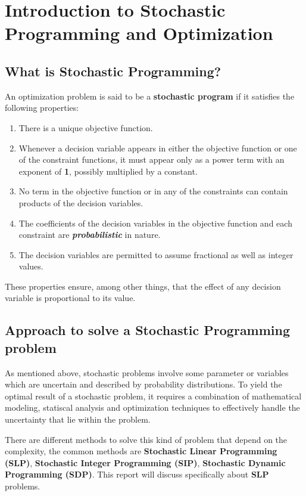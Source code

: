 \newpage
\section{Introduction to Stochastic Programming and Optimization}
	\subsection{What is Stochastic Programming?}
	An optimization problem is said to be a \textbf{stochastic program} if it satisfies the following
properties:

\begin{enumerate}
	\item There is a unique objective function.
	\item Whenever a decision variable appears in either the objective function or one of the constraint functions, it must appear only as a power term with an exponent of \textbf{1}, possibly multiplied by a constant.
	\item No term in the objective function or in any of the constraints can contain products of the
	decision variables.
	\item The coefficients of the decision variables in the objective function and each constraint
	are \textit{\textbf{probabilistic}}  in nature.
	\item The decision variables are permitted to assume fractional as well as integer values.

\end{enumerate}

These properties ensure, among other things, that the effect of any decision variable is proportional to its value.
	
	\subsection{Approach to solve a Stochastic Programming problem}

	\qquad As mentioned above, stochastic problems involve some parameter or variables which are uncertain and described by probability distributions. 
	To yield the optimal result of a stochastic problem, it requires a combination of mathematical modeling, statiscal analysis
	and optimization techniques to effectively handle the uncertainty that lie within the problem.

	\qquad There are different methods to solve this kind of problem that depend on the complexity, the common methods are \textbf{Stochastic Linear Programming (SLP)}, \textbf{Stochastic Integer Programming (SIP)}, \textbf{Stochastic Dynamic Programming (SDP)}.
	This report will discuss specifically about \textbf{SLP} problems.                                                      
	       
